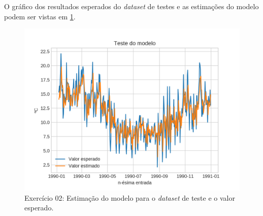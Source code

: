 \documentclass{article}
\begin{document}
    O gráfico dos resultados esperados do \textit{dataset} de testes e as estimações do modelo podem ser vistas em \ref{fig:ex2_comp}. 
    \begin{figure}[!h]
        \centering
        \includegraphics[width=\linewidth]{ex02/model_test.png}
        \caption{Exercício 02: Estimação do modelo para o \textit{dataset} de teste e o valor esperado.}
        \label{fig:ex2_comp}
    \end{figure}
\end{document}
